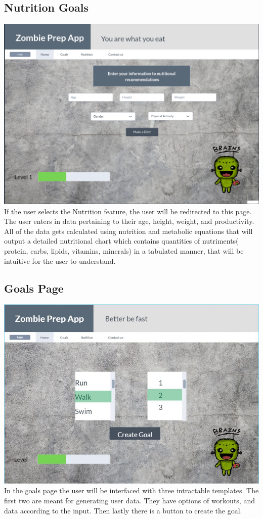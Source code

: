 \documentclass[a4paper]{article}
\begin{document}
\subsection{Nutrition Goals}
\includegraphics[width=\textwidth]{Nutrition.PNG}
If the user selects the Nutrition feature, the user will be redirected to this page. The user enters in data pertaining to their age, height, weight, and productivity. All of the data gets calculated using nutrition and metabolic equations that will output a detailed nutritional chart which contains quantities of nutriments( protein, carbs, lipids, vitamins, minerals) in a tabulated manner, that will be intuitive for the user to understand.

\subsection{Goals Page}
\includegraphics[width=\textwidth]{SetGoals.JPG}
In the goals page the user will be interfaced with three intractable templates. The first two are meant for generating user data. They have options of workouts, and data according to the input. Then lastly there is a button to create the goal.
\end{document}
